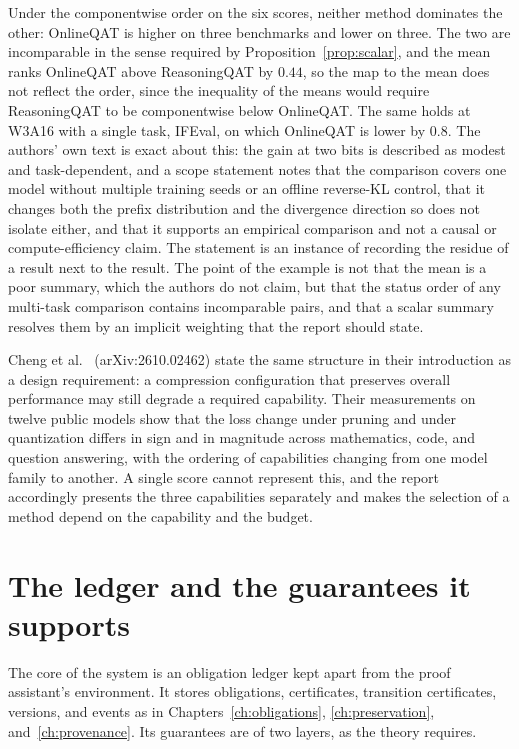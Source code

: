 Under the componentwise order on the six scores, neither method dominates the other: OnlineQAT is higher on three benchmarks and lower on three. The two are incomparable in the sense required by Proposition~\ref{prop:scalar}, and the mean ranks OnlineQAT above ReasoningQAT by $0.44$, so the map to the mean does not reflect the order, since the inequality of the means would require ReasoningQAT to be componentwise below OnlineQAT. The same holds at W3A16 with a single task, IFEval, on which OnlineQAT is lower by $0.8$. The authors' own text is exact about this: the gain at two bits is described as modest and task-dependent, and a scope statement notes that the comparison covers one model without multiple training seeds or an offline reverse-KL control, that it changes both the prefix distribution and the divergence direction so does not isolate either, and that it supports an empirical comparison and not a causal or compute-efficiency claim. The statement is an instance of recording the residue of a result next to the result. The point of the example is not that the mean is a poor summary, which the authors do not claim, but that the status order of any multi-task comparison contains incomparable pairs, and that a scalar summary resolves them by an implicit weighting that the report should state.

Cheng et al.\ \cite{Cheng26} (arXiv:2610.02462) state the same structure in their introduction as a design requirement: a compression configuration that preserves overall performance may still degrade a required capability. Their measurements on twelve public models show that the loss change under pruning and under quantization differs in sign and in magnitude across mathematics, code, and question answering, with the ordering of capabilities changing from one model family to another. A single score cannot represent this, and the report accordingly presents the three capabilities separately and makes the selection of a method depend on the capability and the budget.

\section{The ledger and the guarantees it supports}

The core of the system is an obligation ledger kept apart from the proof assistant's environment. It stores obligations, certificates, transition certificates, versions, and events as in Chapters~\ref{ch:obligations}, \ref{ch:preservation}, and~\ref{ch:provenance}. Its guarantees are of two layers, as the theory requires.


